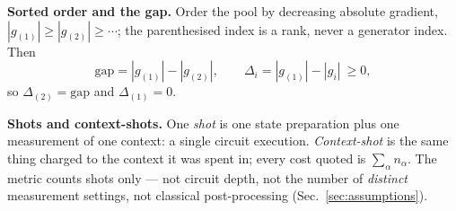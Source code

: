 \documentclass[10pt]{article}
\begin{document}
\textbf{Sorted order and the gap.} Order the pool by decreasing absolute gradient, $|g_{(1)}|\ge|g_{(2)}|\ge\cdots$; the parenthesised index is a rank, never a generator index. Then
\begin{equation}
  \mathrm{gap}=|g_{(1)}|-|g_{(2)}|,
  \qquad
  \Delta_i=|g_{(1)}|-|g_i| \ \ge 0 ,
  \label{eq:gap}
\end{equation}
so $\Delta_{(2)}=\mathrm{gap}$ and $\Delta_{(1)}=0$.

\textbf{Shots and context-shots.} One \emph{shot} is one state preparation plus one measurement of one context: a single circuit execution. \emph{Context-shot} is the same thing charged to the context it was spent in; every cost quoted is $\sum_\alpha n_\alpha$. The metric counts shots only --- not circuit depth, not the number of \emph{distinct} measurement settings, not classical post-processing (Sec.~\ref{sec:assumptions}).
\end{document}
